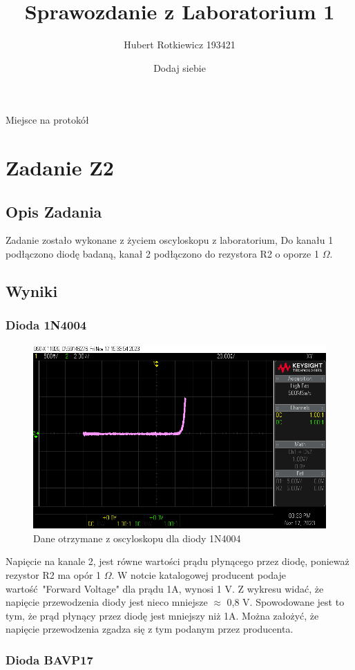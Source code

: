 \documentclass{article}
\title{Sprawozdanie z Laboratorium 1}
\author{
  Hubert Rotkiewicz 193421 \and 
Dodaj siebie
}
\begin{document}
Miejsce na protokół
\maketitle
\section{Zadanie Z2}
\subsection{Opis Zadania}
\centering
Zadanie zostało wykonane z życiem oscyloskopu z laboratorium, Do kanału 1 podłączono diodę badaną,
kanał 2 podłączono do rezystora R2 o oporze 1 $\Omega$. 
\raggedright
\subsection{Wyniki}
\subsubsection{Dioda 1N4004}
\centering
\begin{figure}[h]
\centering
\includegraphics[scale=0.35]{./img/scope_0.png}
  \caption{Dane otrzymane z oscyloskopu dla diody 1N4004}
\end{figure}
Napięcie na kanale 2, jest równe wartości prądu płynącego przez diodę, ponieważ rezystor R2 ma opór 1 $\Omega$.
W notcie katalogowej producent podaje wartość "Forward Voltage" dla prądu 1A, wynosi 1 V. Z wykresu widać, że napięcie 
przewodzenia diody jest nieco mniejsze $\approx$ 0,8 V. Spowodowane jest to tym, że prąd płynący przez diodę jest mniejszy niż 1A. Można założyć, że napięcie przewodzenia zgadza się z tym podanym przez producenta.
\raggedright
\subsubsection{Dioda BAVP17}
\end{document}
